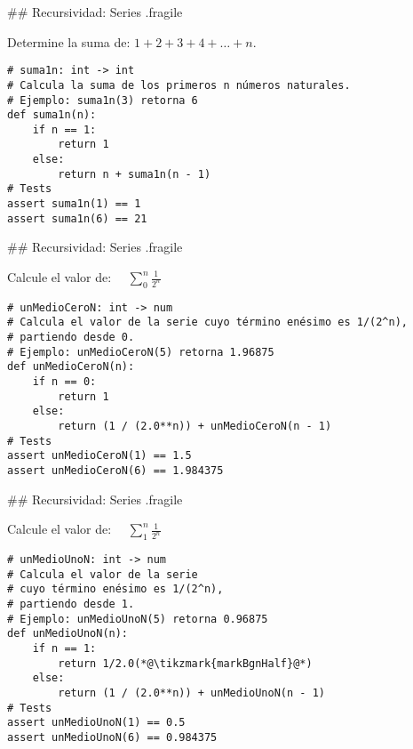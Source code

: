 ## Recursividad: Series {.fragile}

\bgnblockgood
{} Determine la suma de: $1 + 2 + 3 + 4 + \ldots + n$.
\trmblockgood

\pause

\begin{lstlisting}[style=frame02]
# suma1n: int -> int
# Calcula la suma de los primeros n números naturales.
# Ejemplo: suma1n(3) retorna 6
def suma1n(n):
    if n == 1:
        return 1
    else:
        return n + suma1n(n - 1)
# Tests
assert suma1n(1) == 1
assert suma1n(6) == 21
\end{lstlisting}

## Recursividad: Series {.fragile}

\bgnblockgood
{} Calcule el valor de: $\quad\sum\limits_{0}^n \frac{1}{2^n}$
\trmblockgood

\pause

\begin{small}
\begin{lstlisting}[style=frame02]
# unMedioCeroN: int -> num
# Calcula el valor de la serie cuyo término enésimo es 1/(2^n),
# partiendo desde 0.
# Ejemplo: unMedioCeroN(5) retorna 1.96875
def unMedioCeroN(n):
    if n == 0:
        return 1
    else:
        return (1 / (2.0**n)) + unMedioCeroN(n - 1)
# Tests
assert unMedioCeroN(1) == 1.5
assert unMedioCeroN(6) == 1.984375
\end{lstlisting}
\end{small}

## Recursividad: Series {.fragile}

\bgnblockgood
{} Calcule el valor de: $\quad\sum\limits_{1}^n \frac{1}{2^n}$
\trmblockgood

\pause

\begin{small}
\begin{lstlisting}[style=frame02]
# unMedioUnoN: int -> num
# Calcula el valor de la serie
# cuyo término enésimo es 1/(2^n),
# partiendo desde 1.
# Ejemplo: unMedioUnoN(5) retorna 0.96875
def unMedioUnoN(n):
    if n == 1:
        return 1/2.0(*@\tikzmark{markBgnHalf}@*)
    else:
        return (1 / (2.0**n)) + unMedioUnoN(n - 1)
# Tests
assert unMedioUnoN(1) == 0.5
assert unMedioUnoN(6) == 0.984375
\end{lstlisting}
\end{small}


